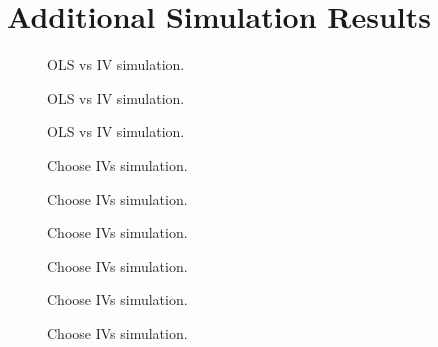 \section{Additional Simulation Results}

\begin{figure}
\centering
	
	\caption{OLS vs IV simulation.}
\end{figure}

\begin{figure}
\centering
	
	\caption{OLS vs IV simulation.}
\end{figure}

\begin{figure}
\centering
	
	\caption{OLS vs IV simulation.}
\end{figure}


\begin{figure}
\centering
	
	\caption{Choose IVs simulation.}
\end{figure}

\begin{figure}
\centering
	
	\caption{Choose IVs simulation.}
\end{figure}

\begin{figure}
\centering
	
	\caption{Choose IVs simulation.}
\end{figure}

\begin{figure}
\centering
	
	\caption{Choose IVs simulation.}
\end{figure}

\begin{figure}
\centering
	
	\caption{Choose IVs simulation.}
\end{figure}

\begin{figure}
\centering
	
	\caption{Choose IVs simulation.}
\end{figure}

